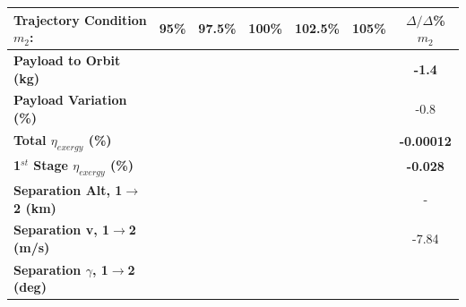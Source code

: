 \begin{table}[ht]
\centering
\begin{tabular}{l c c c c c c} 
	\hline \textbf{Trajectory Condition}   \qquad  $m_{2}$:
	&95\%
	&97.5\%
	&100\%
	&102.5\%
	&105\%
	& $\Delta/\Delta$\%$m_{2}$
	\\
	\hline \textbf{Payload to Orbit (kg)}
	& \textbf{\PayloadToOrbitmSPARTANNinetyFive}
	& \textbf{\PayloadToOrbitmSPARTANNinetySevenFive}
	& \textbf{\PayloadToOrbitmSPARTANStandard}
	& \textbf{\PayloadToOrbitmSPARTANOneHundredTwoFive}
	& \textbf{\PayloadToOrbitmSPARTANOneHundredFive}
	&\textbf{-1.4}
	\\
	\textbf{Payload Variation (\%)}
	& \PayloadVarmSPARTANNinetyFive
	& \PayloadVarmSPARTANNinetySevenFive
	& \PayloadVarmSPARTANStandard
	& \PayloadVarmSPARTANOneHundredTwoFive
	& \PayloadVarmSPARTANOneHundredFive
	&-0.8
	\\
	\textbf{Total $\eta_{exergy}$ (\%)}
	& \textbf{\totalExergyEffmSPARTANNinetyFive}
	& \textbf{\totalExergyEffmSPARTANNinetySevenFive}
	& \textbf{\totalExergyEffmSPARTANStandard}
	& \textbf{\totalExergyEffmSPARTANOneHundredTwoFive}
	& \textbf{\totalExergyEffmSPARTANOneHundredFive}
	& \textbf{-0.00012}
	\\
	\hline 
	\textbf{1$^{st}$ Stage $\eta_{exergy}$ (\%)}
	& \textbf{\firstExergyEffmSPARTANNinetyFive}
	& \textbf{\firstExergyEffmSPARTANNinetySevenFive}
	& \textbf{\firstExergyEffmSPARTANStandard}
	& \textbf{\firstExergyEffmSPARTANOneHundredTwoFive}
	& \textbf{\firstExergyEffmSPARTANOneHundredFive}
	& \textbf{-0.028}
	\\
	\textbf{Separation Alt, 1$\rightarrow$2 (km)}
	& \firstsecondSeparationAltmSPARTANNinetyFive
	& \firstsecondSeparationAltmSPARTANNinetySevenFive
	& \firstsecondSeparationAltmSPARTANStandard
	& \firstsecondSeparationAltmSPARTANOneHundredTwoFive
	& \firstsecondSeparationAltmSPARTANOneHundredFive
	& -
	\\
	\textbf{Separation v, 1$\rightarrow$2 (m/s)}
	& \firstsecondSeparationvmSPARTANNinetyFive
	& \firstsecondSeparationvmSPARTANNinetySevenFive
	& \firstsecondSeparationvmSPARTANStandard
	& \firstsecondSeparationvmSPARTANOneHundredTwoFive
	& \firstsecondSeparationvmSPARTANOneHundredFive
	&-7.84
	\\
	\textbf{Separation $\gamma$, 1$\rightarrow$2 (deg)}
	& \firstsecondSeparationgammamSPARTANNinetyFive
	& \firstsecondSeparationgammamSPARTANNinetySevenFive
	& \firstsecondSeparationgammamSPARTANStandard
	& \firstsecondSeparationgammamSPARTANOneHundredTwoFive
	& \firstsecondSeparationgammamSPARTANOneHundredFive

\end{tabular}
\end{table}
